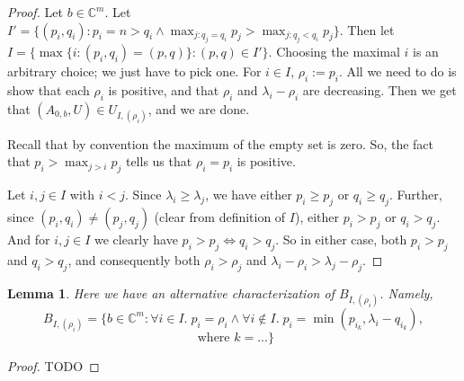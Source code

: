 \documentclass[12pt,psamsfonts]{article}
\newtheorem{lemma}[theorem]{Lemma}
\begin{document}
\begin{proof}
    Let \(b \in \mathbb{C}^m\).
    Let \(I' = \{(p_i, q_i) : p_i = n > q_i \land \max_{j : q_j = q_i} p_j > \max_{j : q_j < q_i} p_j\}\).
    Then let \(I = \{\max\{i : (p_i, q_i) = (p, q)\} : (p, q) \in I'\}\).
    Choosing the maximal \(i\) is an arbitrary choice; we just have to pick one.
    For \(i \in I\), \(\rho_i := p_i\).
    All we need to do is show that each \(\rho_i\) is positive, and that \(\rho_i\) and \(\lambda_i - \rho_i\) are decreasing.
    Then we get that \((A_{0,b}, U) \in U_{I, (\rho_i)}\), and we are done.
    \par Recall that by convention the maximum of the empty set is zero.
    So, the fact that \(p_i > \max_{j > i} p_j\) tells us that \(\rho_i = p_i\) is positive.
    \par Let \(i, j \in I\) with \(i < j\).
    Since \(\lambda_i \geq \lambda_j\), we have either \(p_i \geq p_j\) or \(q_i \geq q_j\).
    Further, since \((p_i, q_i) \neq (p_j, q_j)\) (clear from definition of \(I\)), either \(p_i > p_j\) or \(q_i > q_j\).
    And for \(i, j \in I\) we clearly have \(p_i > p_j \iff q_i > q_j\).
    So in either case, both \(p_i > p_j\) and \(q_i > q_j\), and consequently both \(\rho_i > \rho_j\) and \(\lambda_i - \rho_i > \lambda_j - \rho_j\).
\end{proof}

\begin{lemma}
    Here we have an alternative characterization of \(B_{I, (\rho_i)}\).
    Namely,
    \[B_{I, (\rho_i)} = \{b \in \mathbb{C}^m : \forall i \in I. \; p_i = \rho_i \land \forall i \notin I. \; p_i = \min(p_{i_k}, \lambda_i - q_{i_k}), \]
    \[\textrm{ where } k = ...\}\]
\end{lemma}
\begin{proof}
    TODO
\end{proof}
\end{document}
